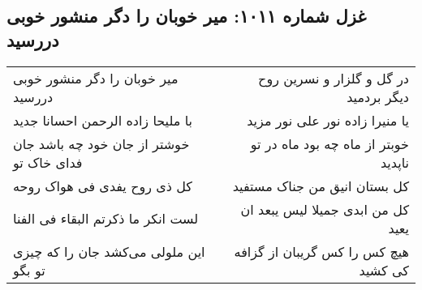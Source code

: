 \begin{center}
\section*{غزل شماره ۱۰۱۱: میر خوبان را دگر منشور خوبی دررسید}
\label{sec:1011}
\begin{longtable}{l p{0.5cm} r}
میر خوبان را دگر منشور خوبی دررسید
&&
در گل و گلزار و نسرین روح دیگر بردمید
\\
با ملیحا زاده الرحمن احسانا جدید
&&
یا منیرا زاده نور علی نور مزید
\\
خوشتر از جان خود چه باشد جان فدای خاک تو
&&
خوبتر از ماه چه بود ماه در تو ناپدید
\\
کل ذی روح یفدی فی هواک روحه
&&
کل بستان انیق من جناک مستفید
\\
لست انکر ما ذکرتم البقاء فی الفنا
&&
کل من ابدی جمیلا لیس یبعد ان یعید
\\
این ملولی می‌کشد جان را که چیزی تو بگو
&&
هیچ کس را کس گریبان از گزافه کی کشید
\\
\end{longtable}
\end{center}
